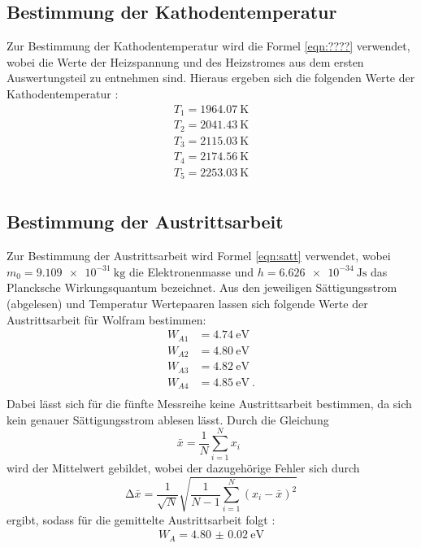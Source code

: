 \subsection{Bestimmung der Kathodentemperatur}
Zur Bestimmung der Kathodentemperatur wird die Formel \ref{eqn:????} verwendet, wobei
die Werte der Heizspannung und des Heizstromes aus dem ersten Auswertungsteil zu
entnehmen sind. Hieraus ergeben sich die folgenden Werte der Kathodentemperatur :
\begin{align*}
  T_1= \SI{1964.07}{\kelvin} \\
  T_2= \SI{2041.43}{\kelvin} \\
  T_3= \SI{2115.03}{\kelvin} \\
  T_4= \SI{2174.56}{\kelvin} \\
  T_5= \SI{2253.03}{\kelvin} \\
\end{align*}
\subsection{Bestimmung der Austrittsarbeit}
Zur Bestimmung der Austrittsarbeit wird Formel \ref{eqn:satt} verwendet, wobei
$m_0 = \SI{9.109e-31}{\kilo\gram} $ \cite{q3} die Elektronenmasse und $h= \SI{6.626e-34}{\joule\second}$ \cite{q4}
das Plancksche Wirkungsquantum bezeichnet.
Aus den jeweiligen Sättigungsstrom (abgelesen) und Temperatur Wertepaaren lassen sich
folgende Werte der Austrittsarbeit für Wolfram bestimmen:
\begin{align*}
  W_{A1} &= \SI{4.74}{\electronvolt} \\
  W_{A2} &= \SI{4.80}{\electronvolt} \\
  W_{A3} &= \SI{4.82}{\electronvolt} \\
  W_{A4} &= \SI{4.85}{\electronvolt} \: .\\
\end{align*}
Dabei lässt sich für die fünfte Messreihe keine Austrittsarbeit bestimmen, da sich
kein genauer Sättigungsstrom ablesen lässt.
Durch die Gleichung
\begin{equation}
  \bar{x} = \frac{1}{N} \sum_{i=1}^{N} x_i \: \:
  \label{eqn:mit}
\end{equation}
\noindent wird der Mittelwert gebildet, wobei der dazugehörige Fehler sich durch
\begin{equation}
  \increment \bar{x} = \frac{1}{\sqrt{N}} \sqrt{ \frac{1}{N-1} \sum_{i=1}^N
  (x_i - \bar{x})^2}
  \label{eqn:mitf}
\end{equation}
ergibt, sodass für die gemittelte Austrittsarbeit folgt :
\begin{align*}
  W_A = \SI{4.80(2)}{\electronvolt} \\
\end{align*}
